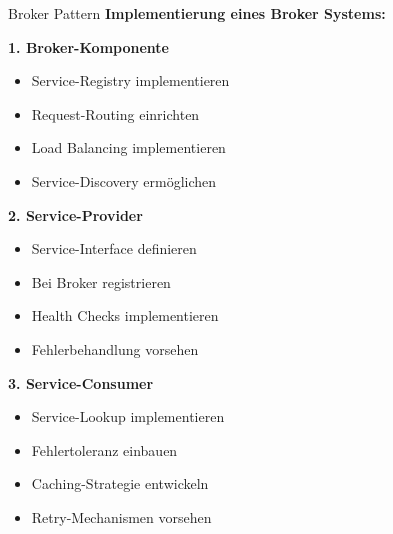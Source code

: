 \begin{KR}{Broker Pattern}
\textbf{Implementierung eines Broker Systems:}

\textbf{1. Broker-Komponente}
\begin{itemize}
    \item Service-Registry implementieren
    \item Request-Routing einrichten
    \item Load Balancing implementieren
    \item Service-Discovery ermöglichen
\end{itemize}

\textbf{2. Service-Provider}
\begin{itemize}
    \item Service-Interface definieren
    \item Bei Broker registrieren
    \item Health Checks implementieren
    \item Fehlerbehandlung vorsehen
\end{itemize}

\textbf{3. Service-Consumer}
\begin{itemize}
    \item Service-Lookup implementieren
    \item Fehlertoleranz einbauen
    \item Caching-Strategie entwickeln
    \item Retry-Mechanismen vorsehen
\end{itemize}
\end{KR}

